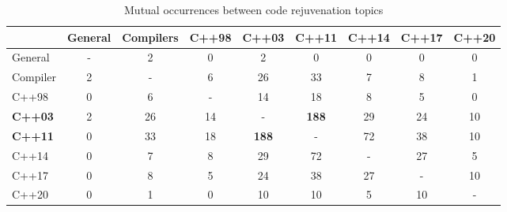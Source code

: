 \begin{table}
\caption{Mutual occurrences between code rejuvenation topics}
  \label{tab:mut_occurr}
\begin{tabular}{@{}lcccccccc@{}}
\toprule
                                    & \multicolumn{1}{l}{General} & \multicolumn{1}{l}{Compilers} & \multicolumn{1}{l}{C++98} & \multicolumn{1}{l}{\textbf{C++03}} & \multicolumn{1}{l}{\textbf{C++11}} & \multicolumn{1}{l}{C++14} & \multicolumn{1}{l}{C++17} & \multicolumn{1}{l}{C++20} \\ \midrule
\multicolumn{1}{l|}{General}        & -                           & 2                             & 0                         & 2                                  & 0                                  & 0                         & 0                         & 0                         \\
\multicolumn{1}{l|}{Compiler}      & 2                           & -                             & 6                         & 26                                 & 33                                 & 7                         & 8                         & 1                         \\
\multicolumn{1}{l|}{C++98}          & 0                           & 6                             & -                         & 14                                 & 18                                 & 8                         & 5                         & 0                         \\
\multicolumn{1}{l|}{\textbf{C++03}} & 2                           & 26                            & 14                        & -                                  & \textbf{188}                       & 29                        & 24                        & 10                        \\
\multicolumn{1}{l|}{\textbf{C++11}} & 0                           & 33                            & 18                        & \textbf{188}                       & -                                  & 72                        & 38                        & 10                        \\
\multicolumn{1}{l|}{C++14}          & 0                           & 7                             & 8                         & 29                                 & 72                                 & -                         & 27                        & 5                         \\
\multicolumn{1}{l|}{C++17}          & 0                           & 8                             & 5                         & 24                                 & 38                                 & 27                        & -                         & 10                        \\
\multicolumn{1}{l|}{C++20}          & 0                           & 1                             & 0                         & 10                                 & 10                                 & 5                         & 10                        & -                         \\ \bottomrule
\end{tabular}
\end{table}


